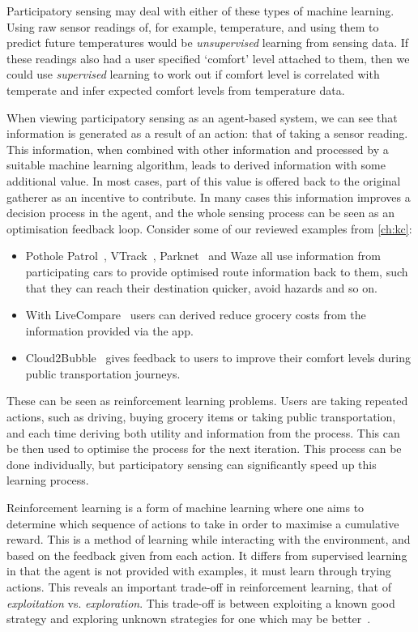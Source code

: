 Participatory sensing may deal with either of these types of machine learning.
Using raw sensor readings of, for example, temperature, and using them to
predict future temperatures would be \emph{unsupervised} learning from sensing
data. If these readings also had a user specified `comfort' level attached to
them, then we could use \emph{supervised} learning to work out if comfort
level is correlated with temperate and infer expected comfort levels from
temperature data.

When viewing participatory sensing as an agent-based system, we can see that
information is generated as a result of an action: that of taking a sensor
reading. This information, when combined with other information and processed
by a suitable machine learning algorithm, leads to derived information with
some additional value. In most cases, part of this value is offered back to
the original gatherer as an incentive to contribute. In many cases this
information improves a decision process in the agent, and the whole sensing
process can be seen as an optimisation feedback loop. Consider some of our
reviewed examples from \autoref{ch:kc}:

\begin{itemize}
\item Pothole Patrol~\citep{Eriksson2008}, VTrack~\citep{Thiagarajan2009}, Parknet~\citep{Mathur2010} and Waze all use information from participating cars to provide optimised route information back to them, such that they can reach their destination quicker, avoid hazards and so on.
\item With LiveCompare~\citep{Deng2009} users can derived reduce grocery costs from the information provided via the app.
\item Cloud2Bubble~\citep{Costa2012} gives feedback to users to improve their comfort levels during public transportation journeys.
\end{itemize}

These can be seen as reinforcement learning problems. Users are taking
repeated actions, such as driving, buying grocery items or taking public
transportation, and each time deriving both utility and information from the
process. This can be then used to optimise the process for the next iteration.
This process can be done individually, but participatory sensing can
significantly speed up this learning process.

Reinforcement learning is a form of machine learning where one aims to
determine which sequence of actions to take in order to maximise a cumulative
reward. This is a method of learning while interacting with the environment,
and based on the feedback given from each action. It differs from supervised
learning in that the agent is not provided with examples, it must learn
through trying actions. This reveals an important trade-off in reinforcement
learning, that of \emph{exploitation} vs. \emph{exploration}. This trade-off
is between exploiting a known good strategy and exploring unknown strategies
for one which may be better~\citep{Sutton1998}.

